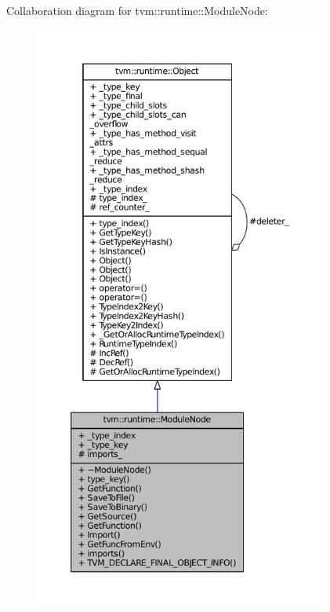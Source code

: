 Collaboration diagram for tvm\+:\+:runtime\+:\+:Module\+Node\+:
\nopagebreak
\begin{figure}[H]
\begin{center}
\leavevmode
\includegraphics[height=550pt]{classtvm_1_1runtime_1_1ModuleNode__coll__graph}
\end{center}
\end{figure}
